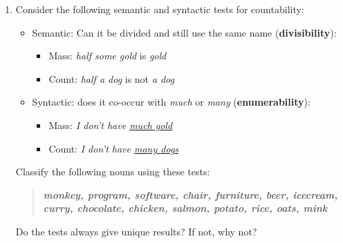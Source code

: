 \documentclass[a4paper]{article}
\newcommand{\lex}[1]{\textbf{\textit{#1}}}
\newcommand{\eng}[1]{\textit{#1}}
\newcommand{\ul}{\uline}
\begin{document}
\begin{enumerate}
\item Consider the following semantic and syntactic tests for countability:
  \begin{itemize}
  \item Semantic: Can it be divided and still use the same name 
    (\textbf{divisibility}):
    \begin{itemize}
    \item Mass:     \eng{half some gold} is \eng{gold}
    \item Count: \eng{half a dog} is not \eng{a dog} 
    \end{itemize}
  \item Syntactic: does it co-occur with \eng{much} or \eng{many}
    (\textbf{enumerability}):
    \begin{itemize}
    \item Mass:  \eng{I don't have \ul{much gold}}
    \item Count: \eng{I don't have \ul{many dogs}} 
    \end{itemize}
  \end{itemize}
  Classify the following nouns using these tests:
  \begin{quote}
    \lex{monkey, program, software, chair, furniture, 
      beer, icecream, curry, chocolate,
      chicken, salmon, potato, rice, oats, mink}
  \end{quote}
  Do the tests always give unique results?  If not, why not?


\end{enumerate}
\end{document}
